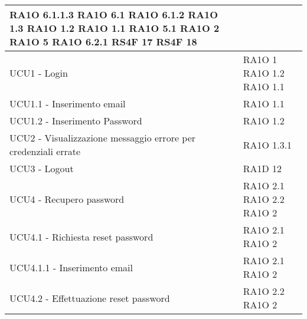 \begin{center}
\begin{longtable}{ | p{5cm} | p{5cm} |}
 RA1O 6.1.1.3  \newline  RA1O 6.1  \newline  RA1O 6.1.2  \newline  RA1O 1.3  \newline  RA1O 1.2 \newline  RA1O 1.1 \newline  RA1O 5.1 \newline  RA1O 2  \newline  RA1O 5  \newline  RA1O 6.2.1 \newline  RS4F 17 \newline  RS4F 18 \newline  \\ \hline      
            UCU1 - Login &  RA1O 1 \newline  RA1O 1.2 \newline  RA1O 1.1 \newline  \\ \hline      
            UCU1.1 - Inserimento email &  RA1O 1.1 \newline  \\ \hline      
            UCU1.2 - Inserimento Password &  RA1O 1.2 \newline  \\ \hline      
            UCU2 - Visualizzazione messaggio errore per credenziali errate &  RA1O 1.3.1 \newline  \\ \hline      
            UCU3 - Logout &  RA1D 12 \newline  \\ \hline      
            UCU4 - Recupero password &  RA1O 2.1 \newline  RA1O 2.2 \newline  RA1O 2  \newline  \\ \hline      
            UCU4.1 - Richiesta reset password &  RA1O 2.1 \newline  RA1O 2  \newline  \\ \hline      
            UCU4.1.1 - Inserimento email &  RA1O 2.1 \newline  RA1O 2  \newline  \\ \hline      
            UCU4.2 - Effettuazione reset password &  RA1O 2.2 \newline  RA1O 2  \newline  \\ \hline      

\end{longtable}
\end{center}
